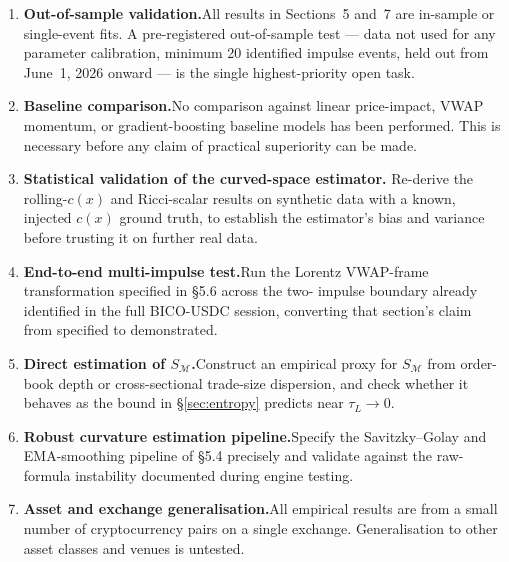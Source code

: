 \documentclass[12pt,a4paper]{article}
\begin{document}
\begin{enumerate}
    \item \textbf{Out-of-sample validation.}\quad All results in
          Sections~5 and~7 are in-sample or single-event fits. A
          pre-registered out-of-sample test --- data not used for any
          parameter calibration, minimum 20 identified impulse events,
          held out from June~1, 2026 onward --- is the single
          highest-priority open task.

    \item \textbf{Baseline comparison.}\quad No comparison against
          linear price-impact, VWAP momentum, or gradient-boosting
          baseline models has been performed. This is necessary before any
          claim of practical superiority can be made.

    \item \textbf{Statistical validation of the curved-space estimator.}
          \quad Re-derive the rolling-$c(x)$ and Ricci-scalar results on
          synthetic data with a known, injected $c(x)$ ground truth, to
          establish the estimator's bias and variance before trusting it
          on further real data.

    \item \textbf{End-to-end multi-impulse test.}\quad Run the Lorentz
          VWAP-frame transformation specified in \S5.6 across the two-
          impulse boundary already identified in the full BICO-USDC
          session, converting that section's claim from specified to
          demonstrated.

    \item \textbf{Direct estimation of $S_{\mathcal{M}}$.}\quad Construct
          an empirical proxy for $S_{\mathcal{M}}$ from order-book depth
          or cross-sectional trade-size dispersion, and check whether it
          behaves as the bound in \S\ref{sec:entropy} predicts near
          $\tau_L\to0$.

    \item \textbf{Robust curvature estimation pipeline.}\quad Specify the
          Savitzky--Golay and EMA-smoothing pipeline of \S5.4 precisely
          and validate against the raw-formula instability documented
          during engine testing.

    \item \textbf{Asset and exchange generalisation.}\quad All empirical
          results are from a small number of cryptocurrency pairs on a
          single exchange. Generalisation to other asset classes and
          venues is untested.


\end{enumerate}
\end{document}
